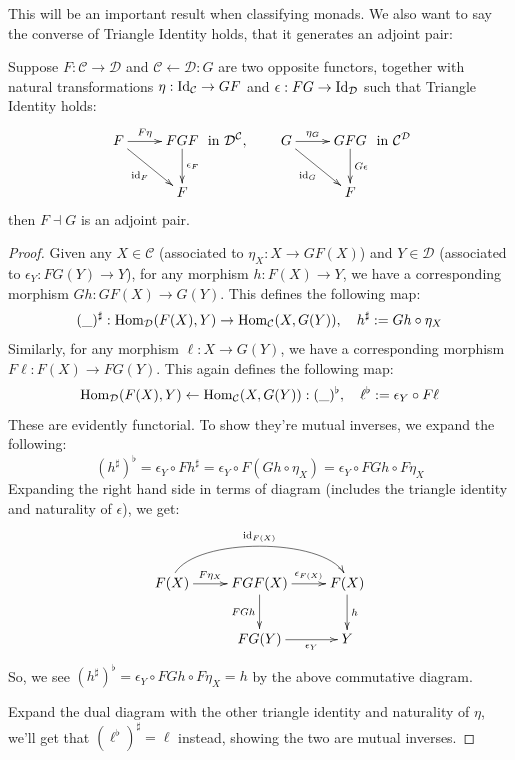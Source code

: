 \documentclass{article}
\begin{document}
This will be an important result when classifying monads. We also want to say the converse of Triangle Identity holds, that it generates an adjoint pair:
\begin{lem}
    Suppose $F:\mathcal{C}\rightarrow \mathcal{D}$ and $\mathcal{C}\leftarrow \mathcal{D}:G$ are two opposite functors, together with natural transformations $\eta:\mathrm{Id}_\mathcal{C}\rightarrow GF$ and $\epsilon:FG\rightarrow \mathrm{Id}_\mathcal{D}$ such that Triangle Identity holds:
    \[\xymatrix{
        F \ar[r]^-{F\eta} \ar[dr]_-{\id_F} & FGF \ar[d]^-{\epsilon_F}\\
        & F
    } \text{ in }\mathcal{D}^\mathcal{C},\quad \quad \xymatrix{
        G \ar[r]^-{\eta_G} \ar[dr]_-{\id_G} & GFG \ar[d]^-{G\epsilon}\\
        & F
    } \text{ in }\mathcal{C}^\mathcal{D}\]
    then $F\dashv G$ is an adjoint pair.
\end{lem}
\begin{proof}
    Given any $X\in \mathcal{C}$ (associated to $\eta_X:X\rightarrow GF(X)$) and $Y\in\mathcal{D}$ (associated to $\epsilon_Y:FG(Y)\rightarrow Y$), for any morphism $h:F(X)\rightarrow Y$, we have a corresponding morphism $Gh:GF(X)\rightarrow G(Y)$. This defines the following map:
    \[(\_)^\sharp:\mathrm{Hom}_\mathcal{D}(F(X),Y)\rightarrow \mathrm{Hom}_\mathcal{C}(X,G(Y)),\quad h^\sharp := Gh\circ \eta_X\]
    Similarly, for any morphism $\ell:X\rightarrow G(Y)$, we have a corresponding morphism $F\ell:F(X)\rightarrow FG(Y)$. This again defines the following map:
    \[\mathrm{Hom}_\mathcal{D}(F(X),Y)\leftarrow \mathrm{Hom}_\mathcal{C}(X,G(Y)):(\_)^\flat,\quad \ell^\flat := \epsilon_Y\circ F\ell\]
    These are evidently functorial. To show they're mutual inverses, we expand the following:
    \[(h^\sharp)^\flat = \epsilon_Y\circ Fh^\sharp = \epsilon_Y\circ F(Gh\circ \eta_X) = \epsilon_Y \circ FGh\circ F\eta_X\]
    Expanding the right hand side in terms of diagram (includes the triangle identity and naturality of $\epsilon$), we get:
    \[\xymatrix{
        F(X) \ar@(u,u)[rr]^-{\id_{F(X)}} \ar[r]^-{F\eta_X} & FGF(X) \ar[d]_-{FGh} \ar[r]^-{\epsilon_{F(X)}} & F(X)\ar[d]^-{h}\\
        & FG(Y) \ar[r]_-{\epsilon_{Y}} & Y
    }\]
    So, we see $(h^\sharp)^\flat = \epsilon_Y\circ FGh\circ F\eta_X = h$ by the above commutative diagram.

    Expand the dual diagram with the other triangle identity and naturality of $\eta$, we'll get that $(\ell^\flat)^\sharp = \ell$ instead, showing the two are mutual inverses.
\end{proof}
\end{document}
